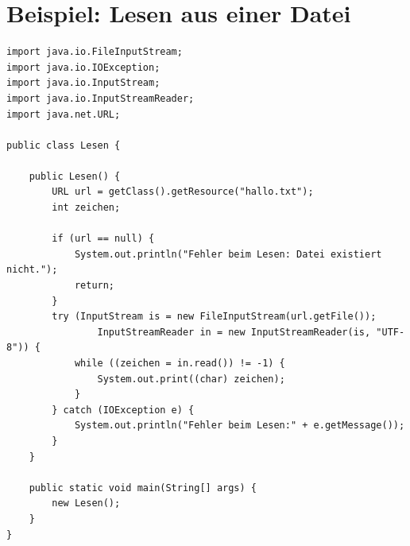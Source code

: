 \section{Beispiel: Lesen aus einer Datei}

\begin{lstlisting}
import java.io.FileInputStream;
import java.io.IOException;
import java.io.InputStream;
import java.io.InputStreamReader;
import java.net.URL;

public class Lesen {
	
    public Lesen() {
        URL url = getClass().getResource("hallo.txt");
        int zeichen;
	
        if (url == null) {
            System.out.println("Fehler beim Lesen: Datei existiert nicht.");
            return;
        }
        try (InputStream is = new FileInputStream(url.getFile());
                InputStreamReader in = new InputStreamReader(is, "UTF-8")) {
            while ((zeichen = in.read()) != -1) {
                System.out.print((char) zeichen);
            }
        } catch (IOException e) {
            System.out.println("Fehler beim Lesen:" + e.getMessage());
        }
    }

    public static void main(String[] args) {
        new Lesen();
    }
}
\end{lstlisting}